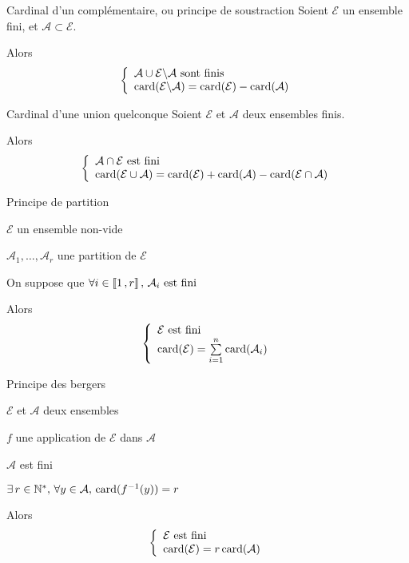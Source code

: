     \begin{coro}{Cardinal d’un complémentaire, ou principe de soustraction}{}
        Soient $\mathcal{E}$ un ensemble fini, et $\mathcal{A} \subset \mathcal{E}$.
    
        Alors 
        \[ \et{\mathcal{A} \cup \mathcal{E} \backslash \mathcal{A} \text{ sont finis}}{\card(\mathcal{E} \backslash \mathcal{A}) = \card(\mathcal{E}) - \card(\mathcal{A})} \]
    \end{coro}

    \begin{coro}{Cardinal d’une union quelconque}{}
        Soient $\mathcal{E}$ et $\mathcal{A}$ deux ensembles finis. 
    
        Alors 
        \[ \et{\mathcal{A} \cap \mathcal{E} \text{ est fini}}{\card(\mathcal{E} \cup \mathcal{A}) = \card(\mathcal{E}) + \card(\mathcal{A}) - \card(\mathcal{E} \cap \mathcal{A})} \]
    \end{coro}

    \begin{coro}{Principe de partition}{}
        \begin{soient}
            \item $\mathcal{E}$ un ensemble non-vide
            \item $\mathcal{A}_1, \ldots, \mathcal{A}_r$ une partition de $\mathcal{E}$
        \end{soient}
        On suppose que $\forall i \in \left\llbracket 1 \, , r \right\rrbracket, \, \mathcal{A}_i \text{ est fini}$

        Alors \[ \et{\mathcal{E} \text{ est fini}}{\card(\mathcal{E}) = \sum\limits_{i=1}^n \card(\mathcal{A}_i)} \]
    \end{coro}

    \begin{prop}{Principe des bergers}{}
        \begin{soient}
            \item $\mathcal{E}$ et $\mathcal{A}$ deux ensembles
            \item $f$ une application de $\mathcal{E}$ dans $\mathcal{A}$
        \end{soient}
        \begin{suppose}
            \item $\mathcal{A}$ est fini
            \item $\exists \, r \in \mathbb{N}^*, \, \forall y \in \mathcal{A}, \, \operatorname{card}(f^{-1}(y)) = r$
        \end{suppose}
        Alors 
        \[ \et{\mathcal{E} \text{ est fini}}{\card(\mathcal{E}) = r \card(\mathcal{A})} \]
    \end{prop}

